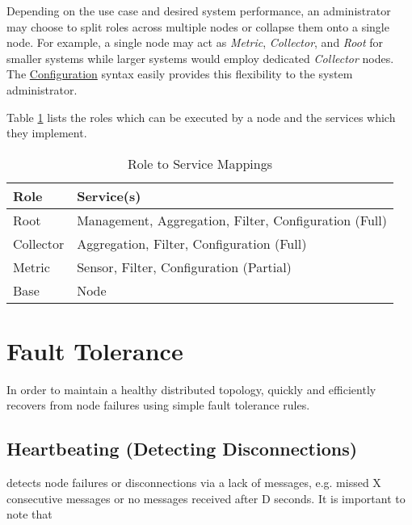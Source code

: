 Depending on the use case and desired system performance, an administrator may choose to split roles across multiple
nodes or collapse them onto a single node. For example, a single node may act as \textit{Metric}, \textit{Collector},
and \textit{Root} for smaller systems while larger systems would employ dedicated \textit{Collector} nodes. The \dcamp
\hyperref[configuration]{Configuration} syntax easily provides this flexibility to the system administrator.

Table \ref{tab:role_to_services} lists the roles which can be executed by a \dcamp node and the services which they
implement.

\begin{table}
\begin{tabular}{l l}

\hline
\textbf{Role} & \textbf{Service(s)} \\
\hline

Root & Management, Aggregation, Filter, Configuration (Full) \\

Collector & Aggregation, Filter, Configuration (Full) \\

Metric & Sensor, Filter, Configuration (Partial) \\

Base & Node \\

\end{tabular}
\caption{Role to Service Mappings}
\label{tab:role_to_services}
\end{table}

\section{Fault Tolerance}

In order to maintain a healthy distributed topology, \dcamp quickly and efficiently recovers from node failures using
simple fault tolerance rules.

\subsection{Heartbeating (Detecting Disconnections)}

\dcamp detects node failures or disconnections via a lack of messages, e.g. missed X consecutive messages or no messages
received after D seconds. It is important to note that

